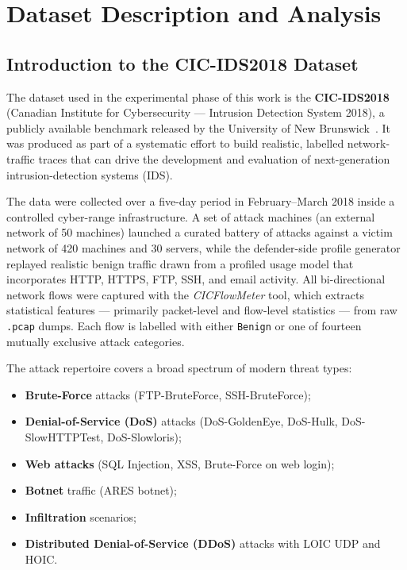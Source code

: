 \chapter{Dataset Description and Analysis}
\label{chap:dataset}

\section{Introduction to the CIC-IDS2018 Dataset}
\label{sec:dataset-intro}

The dataset used in the experimental phase of this work is the
\textbf{CIC-IDS2018} (Canadian Institute for Cybersecurity — Intrusion
Detection System 2018), a publicly available benchmark released by the
University of New Brunswick~\cite{cicids2018}.  It was produced as part of a
systematic effort to build realistic, labelled network-traffic traces that can
drive the development and evaluation of next-generation intrusion-detection
systems (IDS).

The data were collected over a five-day period in February–March 2018 inside a
controlled cyber-range infrastructure.  A set of attack machines (an external
network of 50 machines) launched a curated battery of attacks against a victim
network of 420 machines and 30 servers, while the defender-side profile
generator replayed realistic benign traffic drawn from a profiled usage model
that incorporates HTTP, HTTPS, FTP, SSH, and email activity.  All bi-directional
network flows were captured with the \textit{CIC\-Flow\-Meter} tool, which
extracts statistical features — primarily packet-level and flow-level statistics
— from raw \texttt{.pcap} dumps.  Each flow is labelled with either
\texttt{Benign} or one of fourteen mutually exclusive attack categories.

The attack repertoire covers a broad spectrum of modern threat types:
\begin{itemize}
    \item \textbf{Brute-Force} attacks (FTP-BruteForce, SSH-BruteForce);
    \item \textbf{Denial-of-Service (DoS)} attacks (DoS-GoldenEye,
          DoS-Hulk, DoS-SlowHTTPTest, DoS-Slowloris);
    \item \textbf{Web attacks} (SQL Injection, XSS, Brute-Force on web
          login);
    \item \textbf{Botnet} traffic (ARES botnet);
    \item \textbf{Infiltration} scenarios;
    \item \textbf{Distributed Denial-of-Service (DDoS)} attacks with LOIC
          UDP and HOIC.
\end{itemize}

